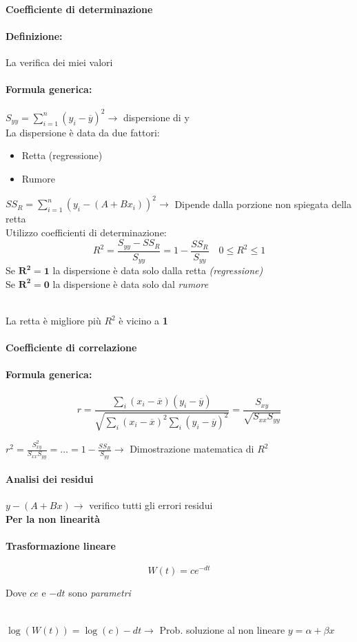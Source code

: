 \documentclass[]{article}
\newcommand{\definizione}{\paragraph{Definizione:}}
\newcommand{\formula}{\paragraph{Formula generica:}}
\begin{document}
    \paragraph{Coefficiente di determinazione}
    \definizione La verifica dei miei valori
    \formula $S_{yy} = \sum_{i = 1}^{n}(y_i - \overline{y})^2 \rightarrow$ dispersione di y \\
    La dispersione è data da due fattori:
    \begin{itemize}
        \item Retta (regressione)
        \item Rumore
    \end{itemize}
    $\displaystyle SS_R = \sum_{i = 1}^{n}(y_i - (A + B x_i))^2 \rightarrow$ Dipende dalla porzione non spiegata della retta \\
    Utilizzo coefficienti di determinazione:
    \[ R^2 = \frac{S_{yy} - SS_R}{S_{yy}} = 1 - \frac{SS_R}{S_{yy}} \quad 0 \leq R^2 \leq 1 \] 
    Se $\mathbf{R^2 = 1}$ la dispersione è data solo dalla retta \textit{(regressione)} \\
    Se $\mathbf{R^2 = 0}$ la dispersione è data solo dal \textit{rumore} \\\\
    \centerline{La retta è migliore più $R^2$ è vicino a \textbf{1}}
    \paragraph{Coefficiente di correlazione}
    \formula
    \[ r = \frac{\sum_{i}^{} (x_i - \overline{x}) (y_i - \overline{y})}{\sqrt{\sum_{i}^{}(x_i - \overline{x})^2 \sum_{i}^{} (y_i - \overline{y})^2}}= \frac{S_{xy}}{\sqrt{S_{xx} S_{yy}}} \]
    \centerline{$r^2 = \frac{S_{xy}^2}{S_{xx} S_{yy}} = \ldots = 1 - \frac{SS_R}{S_{yy}} \rightarrow $ Dimostrazione matematica di $R^2$}
    \paragraph{Analisi dei residui} $y-(A + Bx) \rightarrow$ verifico tutti gli errori residui \\
    \textbf{Per la non linearità}
    \paragraph{Trasformazione lineare}
    \[ W(t) = ce^{-dt} \]
    \centerline{Dove $ce$ e $-dt$ sono \textit{parametri}} \\[3ex]
    $\log(W(t)) = \log(c) -dt \rightarrow$ Prob. soluzione al non lineare $y = \alpha + \beta x$
\end{document}
